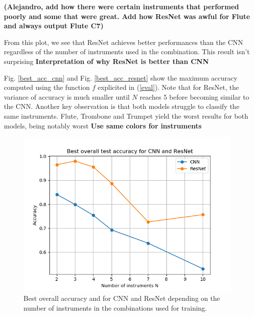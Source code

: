 \documentclass{article}
\begin{document}
\textbf{(Alejandro, add how there were certain instruments that performed poorly and some that were great. Add how ResNet was awful for Flute and always output Flute C7)}

From this plot, we see that ResNet achieves better performances than the CNN regardless of the number of instruments used in the combination. This result isn't surprising \textbf{\color{red} Interpretation of why ResNet is better than CNN}


Fig. \ref{best_acc_cnn} and Fig. \ref{best_acc_resnet} show the maximum accuracy computed using the function $f$ explicited in (\ref{eval}). Note that for ResNet, the variance of accuracy is much smaller until $N$ reaches 5 before becoming similar to the CNN. Another key observation is that both models struggle to classify the same instruments. Flute, Trombone and Trumpet yield the worst results for both models, being notably worst \textbf{\color{red} Use same colors for instruments}


\begin{figure}
\includegraphics[scale=0.57]{figs/CNN_vs_ResNet.png}
\caption{Best overall accuracy and for CNN and ResNet depending on the number of instruments in the combinations used for training. \label{cnn_vs_resnet}}
\end{figure}
\end{document}
